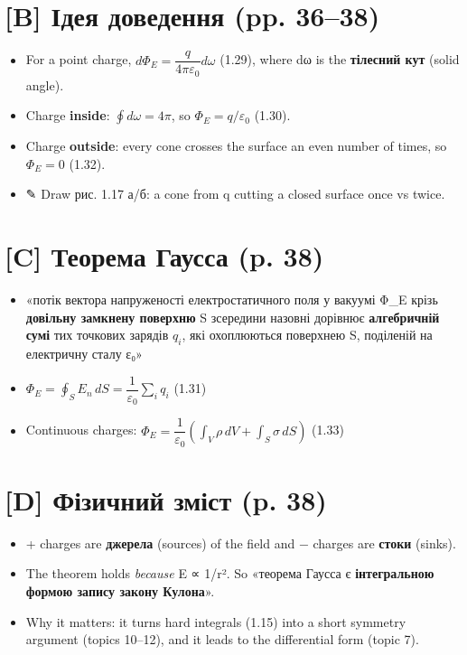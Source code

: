 \documentclass[11pt,a4paper,oneside]{book}
\newcommand{\pen}{{\sffamily\color{accent}✎}}
\begin{document}
\section*{[B] Ідея доведення (pp. 36–38)}
\begin{itemize}
\item For a point charge, $d\Phi_E = \dfrac{q}{4\pi\varepsilon_0}d\omega$ (1.29), where dω is the \textbf{тілесний кут} (solid angle).
\item Charge \textbf{inside}: $\oint d\omega = 4\pi$, so $\Phi_E = q/\varepsilon_0$ (1.30).
\item Charge \textbf{outside}: every cone crosses the surface an even number of times, so $\Phi_E = 0$ (1.32).
\item \pen{} Draw рис. 1.17 а/б: a cone from q cutting a closed surface once vs twice.
\end{itemize}

\section*{[C] Теорема Гаусса (p. 38)}
\begin{itemize}
\item «потік вектора напруженості електростатичного поля у вакуумі Φ\_E крізь \textbf{довільну замкнену поверхню} S зсередини назовні дорівнює \textbf{алгебричній сумі} тих точкових зарядів $q_{i}$, які охоплюються поверхнею S, поділеній на електричну сталу ε₀»
\item $\Phi_E = \oint_S E_n\,dS = \dfrac{1}{\varepsilon_0}\sum_i q_i$ (1.31)
\item Continuous charges: $\Phi_E = \dfrac{1}{\varepsilon_0}\left(\int_V\rho\,dV + \int_S\sigma\,dS\right)$ (1.33)
\end{itemize}

\section*{[D] Фізичний зміст (p. 38)}
\begin{itemize}
\item + charges are \textbf{джерела} (sources) of the field and − charges are \textbf{стоки} (sinks).
\item The theorem holds \textit{because} E ∝ 1/r². So «теорема Гаусса є \textbf{інтегральною формою запису закону Кулона}».
\item Why it matters: it turns hard integrals (1.15) into a short symmetry argument (topics 10–12), and it leads to the differential form (topic 7).
\end{itemize}
\end{document}
